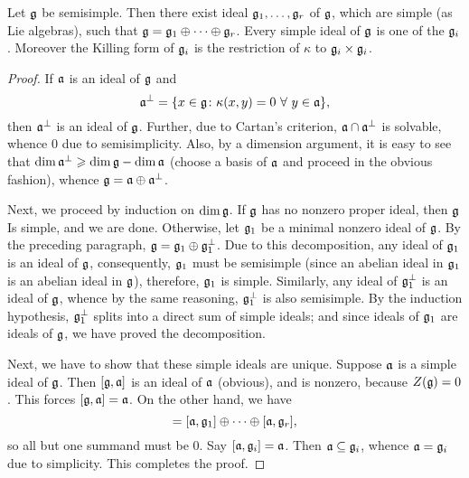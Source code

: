 \begin{theorem}
    Let $\mathfrak{g}$ be semisimple. Then there exist ideal $\mathfrak{g}_1,\dots,\mathfrak{g}_r$ of $\mathfrak{g}$, which are simple (as Lie algebras), such that $\mathfrak{g} = \mathfrak{g}_1\oplus\cdots\oplus\mathfrak{g}_r$. Every simple ideal of $\mathfrak{g}$ is one of the $\mathfrak{g}_i$. Moreover the Killing form of $\mathfrak{g}_i$ is the restriction of $\kappa$ to $\mathfrak{g}_i\times\mathfrak{g}_i$.
\end{theorem}
\begin{proof}
    If $\mathfrak{a}$ is an ideal of $\mathfrak{g}$ and 
    \begin{equation*}
        \mathfrak{a}^\perp = \{x\in\mathfrak{g}\colon\kappa(x, y) = 0~\forall~y\in\mathfrak{a}\},
    \end{equation*}
    then $\mathfrak{a}^\perp$ is an ideal of $\mathfrak{g}$. Further, due to Cartan's criterion, $\mathfrak{a}\cap\mathfrak{a}^{\perp}$ is solvable, whence $0$ due to semisimplicity. Also, by a dimension argument, it is easy to see that $\dim\mathfrak{a}^{\perp}\geqslant\dim\mathfrak{g} - \dim\mathfrak{a}$ (choose a basis of $\mathfrak{a}$ and proceed in the obvious fashion), whence $\mathfrak{g} = \mathfrak{a}\oplus\mathfrak{a}^{\perp}$.

    Next, we proceed by induction on $\dim\mathfrak{g}$. If $\mathfrak{g}$ has no nonzero proper ideal, then $\mathfrak{g}$ Is simple, and we are done. Otherwise, let $\mathfrak{g}_1$ be a minimal nonzero ideal of $\mathfrak{g}$. By the preceding paragraph, $\mathfrak{g} = \mathfrak{g}_1\oplus\mathfrak{g}_1^\perp$. Due to this decomposition, any ideal of $\mathfrak{g}_1$ is an ideal of $\mathfrak{g}$, consequently, $\mathfrak{g}_1$ must be semisimple (since an abelian ideal in $\mathfrak{g}_1$ is an abelian ideal in $\mathfrak{g}$), therefore, $\mathfrak{g}_1$ is simple. Similarly, any ideal of $\mathfrak{g}_1^\perp$ is an ideal of $\mathfrak{g}$, whence by the same reasoning, $\mathfrak{g}_1^\perp$ is also semisimple. By the induction hypothesis, $\mathfrak{g}_1^\perp$ splits into a direct sum of simple ideals; and since ideals of $\mathfrak{g}_1$ are ideals of $\mathfrak{g}$, we have proved the decomposition.

    Next, we have to show that these simple ideals are unique. Suppose $\mathfrak{a}$ is a simple ideal of $\mathfrak{g}$. Then $[\mathfrak{g},\mathfrak{a}]$ is an ideal of $\mathfrak{a}$ (obvious), and is nonzero, because $Z(\mathfrak{g}) = 0$. This forces $[\mathfrak{g},\mathfrak{a}] = \mathfrak{a}$. On the other hand, we have 
    \begin{equation*}
        [\fraka,\frakg] = [\fraka,\frakg_1]\oplus\dots\oplus[\fraka,\frakg_r], 
    \end{equation*}
    so all but one summand must be $0$. Say $[\mathfrak{a},\mathfrak{g}_i] = \mathfrak{a}$. Then $\mathfrak{a}\subseteq\mathfrak{g}_i$, whence $\mathfrak{a} = \mathfrak{g}_i$ due to simplicity. This completes the proof.
\end{proof}

